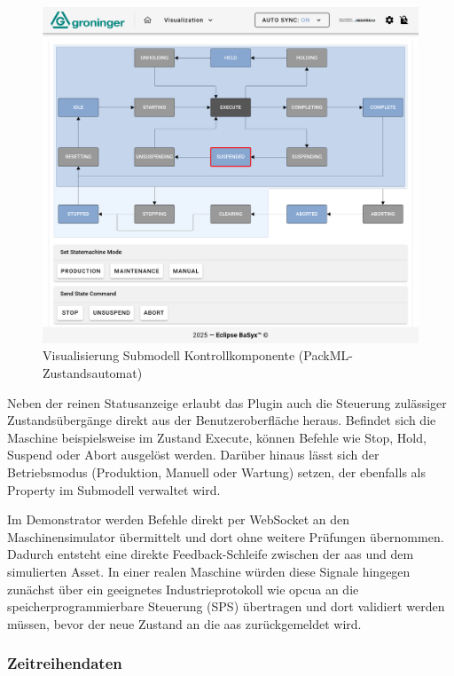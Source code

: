 \begin{figure}[htbp]
    \centering 
    \includegraphics[width=1\textwidth]{Bilder/ErgebnisseAASWebUI/Kontrollkomponente.png} 
    \caption[Visualisierung Submodell Kontrollkomponente]{Visualisierung Submodell Kontrollkomponente (PackML-Zustandsautomat)} 
    \label{fig:PackMLZustandsautomat} 
\end{figure}
\vspace{-0.5em}

Neben der reinen Statusanzeige erlaubt das Plugin auch die Steuerung zulässiger Zustandsübergänge direkt aus der Benutzeroberfläche heraus.
Befindet sich die Maschine beispielsweise im Zustand Execute, können Befehle wie Stop, Hold, Suspend oder Abort ausgelöst werden.
Darüber hinaus lässt sich der Betriebsmodus (Produktion, Manuell oder Wartung) setzen, der ebenfalls als Property im Submodell verwaltet wird.


Im Demonstrator werden Befehle direkt per WebSocket an den Maschinensimulator übermittelt und dort ohne weitere Prüfungen übernommen. 
Dadurch entsteht eine direkte Feedback-Schleife zwischen der \acs{aas} und dem simulierten Asset.
In einer realen Maschine würden diese Signale hingegen zunächst über ein geeignetes Industrieprotokoll wie \acs{opcua} an die speicherprogrammierbare Steuerung (SPS) übertragen und dort validiert werden müssen, bevor der neue Zustand an die \acs{aas} zurückgemeldet wird.

\subsubsection*{Zeitreihendaten}
\vspace{-0.5em}

